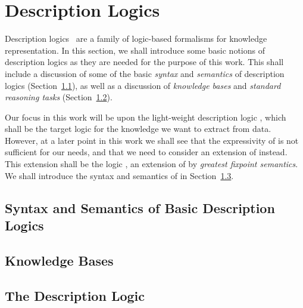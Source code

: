\chapter{Description Logics}
\label{cha:description-logics}

Description logics~\cite{DLhandbook} are a family of logic-based formalisms for knowledge
representation.  In this section, we shall introduce some basic notions of description
logics as they are needed for the purpose of this work.  This shall include a discussion
of some of the basic \emph{syntax} and \emph{semantics} of description logics
(Section~\ref{sec:basic-noti-descr}), as well as a discussion of \emph{knowledge bases}
and \emph{standard reasoning tasks} (Section~\ref{sec:knowledge-bases}).

Our focus in this work will be upon the light-weight description logic \ELbot, which shall
be the target logic for the knowledge we want to extract from data.  However, at a later
point in this work we shall see that the expressivity of \ELbot is not sufficient for our
needs, and that we need to consider an extension of \ELbot instead.  This extension shall
be the logic \ELgfpbot, an extension of \ELbot by \emph{greatest fixpoint semantics}.  We
shall introduce the syntax and semantics of \ELgfpbot in
Section~\ref{sec:descr-logics-elbot}.

\section{Syntax and Semantics of Basic Description Logics}
\label{sec:basic-noti-descr}

%
%
%

\section{Knowledge Bases}
\label{sec:knowledge-bases}

%
%
%

\section{The Description Logic \ELgfpbot}
\label{sec:descr-logics-elbot}

%
%

